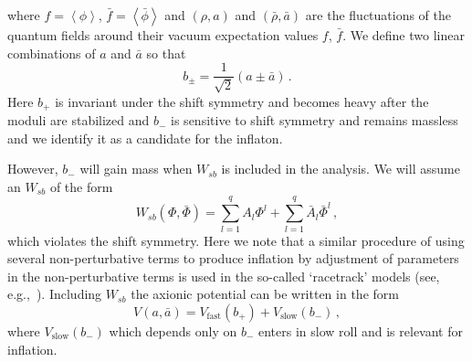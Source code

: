 \documentclass[12pt]{article}
\begin{document}
where $f = \left<\phi\right>$, $\bar f = \left<\bar\phi\right>$ and $\left(\rho, a\right)$ and $\left(\bar\rho, \bar a\right)$ are the fluctuations of the quantum fields around their vacuum expectation values $f$, $\bar f$.
We define two linear combinations of $a$ and $\bar a$ so that
\begin{equation} \label{eq:b+-}
  b_{\pm}= \frac{1}{\sqrt 2} \left(a \pm \bar a\right)\,.
\end{equation}
Here $b_+$ is invariant under the shift symmetry and becomes heavy after the moduli are stabilized and $b_-$ is sensitive to shift symmetry and remains massless and we identify it as a candidate for the inflaton.

However, $b_-$ will gain mass when $W_{sb}$ is included in the analysis.
We will assume an $W_{sb}$ of the form
\begin{equation} \label{eq:supersymmetry:Wsb}
  W_{sb}\left(\Phi, \bar\Phi\right) =
      \sum_{l = 1}^q A_l \Phi^l
    + \sum_{l = 1}^q \bar A_l \bar\Phi^l\,,
\end{equation}
which violates the shift symmetry.
Here we note that a similar procedure of using several non-perturbative terms to produce inflation by adjustment of parameters in the non-perturbative terms is used in the so-called `racetrack' models (see, e.g.,~\cite{BlancoPillado:2004ns, Lalak:2005hr, Greene:2005rn, BlancoPillado:2006he}).
Including $W_{sb}$ the axionic potential can be written in the form
\begin{equation}
  V\left(a, \bar a\right) = V_\text{fast}\left(b_+\right) + V_\text{slow}\left(b_-\right)\,,
\end{equation}
where $V_\text{slow}\left(b_-\right)$ which depends only on $b_-$ enters in slow roll and is relevant for inflation.
\end{document}
